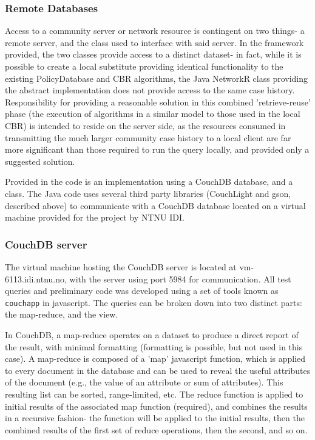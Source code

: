 \subsubsection{Remote Databases}  
Access to a community server or network resource is contingent on two things- a remote server, and the class used to interface with said server. In the framework provided, the two classes provide access to a distinct dataset- in fact, while it is possible to create a local substitute providing identical functionality to the existing PolicyDatabase and CBR algorithms, the Java NetworkR class providing the abstract implementation does not provide access to the same case history. Responsibility for providing a reasonable solution in this combined 'retrieve-reuse' phase (the execution of algorithms in a similar model to those used in the local CBR) is intended to reside on the server side, as the resources consumed in transmitting the much larger community case history to a local client are far more significant than those required to run the query locally, and provided only a suggested solution.

Provided in the code is an implementation using a CouchDB database, and a class. The Java code uses several third party libraries (CouchLight and gson, described above) to communicate with a CouchDB database located on a virtual machine provided for the project by NTNU IDI.

\subsubsection{CouchDB server}
The virtual machine hosting the CouchDB server is located at vm-6113.idi.ntnu.no, with the server using port 5984 for communication. All test queries and preliminary code was developed using a set of tools known as \texttt{couchapp} in javascript. The queries can be broken down into two distinct parts: the map-reduce, and the view. 

In CouchDB, a map-reduce operates on a dataset to produce a direct report of the result, with minimal formatting (formatting is possible, but not used in this case). A  map-reduce is composed of a 'map' javascript function, which is applied to every document in the database and can be used to reveal the useful attributes of the document (e.g., the value of an attribute or sum of attributes). This resulting list can be sorted, range-limited, etc. The reduce function is applied to initial results of the associated map function (required), and combines the results in a recursive fashion- the function will be applied to the initial results, then the combined results of the first set of reduce operations, then the second, and so on. 

